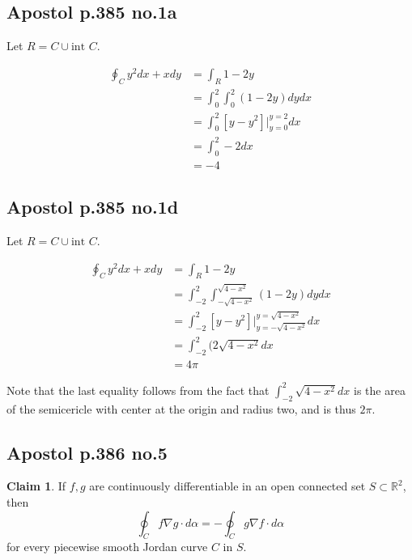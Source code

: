 \documentclass[12pt,letterpaper]{article}
\theoremstyle{definition}
\newtheorem*{claim}{Claim}
\newcommand{\R}{\mathbb{R}}
\begin{document}
\subsection*{Apostol p.385 no.1a}

Let $R = C \cup \text{int } C$.

\begin{align*}
  \oint_C y^2dx + xdy &= \int_R 1 - 2y \\
                                  &= \int_0^2\int_0^2(1-2y)dydx \\
                                  &= \int_0^2\left[ y-y^2 \right]\Big|_{y=0}^{y=2}dx \\
                                  &= \int_0^2 -2dx \\
                                  &= -4
\end{align*}

\subsection*{Apostol p.385 no.1d}

Let $R = C \cup \text{int } C$.

\begin{align*}
  \oint_C y^2dx + xdy &= \int_R 1 - 2y \\
                                  &= \int_{-2}^2\int_{-\sqrt{4-x^2}}^{\sqrt{4-x^2}}(1-2y)dydx \\
                                  &= \int_{-2}^2\left[ y-y^2 \right]\Big|_{y=-\sqrt{4-x^2}}^{y=\sqrt{4-x^2}}dx \\
                                  &= \int_{-2}^2 (2\sqrt{4-x^2}dx \\
                                  &= 4\pi
\end{align*}

Note that the last equality follows from the fact that
$\int_{-2}^2\sqrt{4-x^2}dx$ is the area of the semicericle with center at the
origin and radius two, and is thus $2\pi$.

\subsection*{Apostol p.386 no.5}

\begin{claim}
  If $f,g$ are continuously differentiable in an open connected set $S \subset \R^2$, then
  \[
    \oint_C f \nabla g \cdot d\alpha = -\oint_C g\nabla f\cdot d\alpha
  \]
  for every piecewise smooth Jordan curve $C$ in $S$.
\end{claim}
\end{document}
